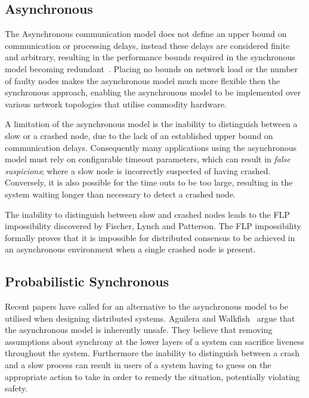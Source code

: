 	\subsection{Asynchronous}
	The Asynchronous communication model does not define an upper bound on communication or processing delays, instead these delays are considered finite and arbitrary, resulting in the performance bounds required in the synchronous model becoming redundant~\cite{Cristian:1996:SA:227210.227231}. Placing no bounds on network load or the number of faulty nodes makes the asynchronous model much more flexible then the synchronous approach, enabling the asynchronous model to be implemented over various network topologies that utilise commodity hardware. 

	A limitation of the asynchronous model is the inability to distinguish between a slow or a crashed node, due to the lack of an established upper bound on communication delays.  Consequently many applications using the asynchronous model must rely on configurable timeout parameters, which can result in \emph{false suspicions}; where a slow node is incorrectly suspected of having crashed.  Conversely, it is also possible for the time outs to be too large, resulting in the system waiting longer than necessary to detect a crashed node.  
	
	The inability to distinguish between slow and crashed nodes leads to the FLP impossibility discovered by Fischer, Lynch and Patterson\citep{Fischer:1985:IDC:3149.214121}.  The FLP impossibility formally proves that it is impossible for distributed consensus to be achieved in an asynchronous environment when a single crashed node is present. 
	
	\subsection{Probabilistic Synchronous}
	Recent papers have called for an alternative to the asynchronous model to be utilised when designing distributed systems. Aguilera and Walkfish~\cite{Aguilera:2009:NTA:1855568.1855571} argue that the asynchronous model is inherently unsafe. They believe that removing assumptions about synchrony at the lower layers of a system can sacrifice liveness throughout the system. Furthermore the inability to distinguish between a crash and a slow process can result in users of a system having to guess on the appropriate action to take in order to remedy the situation, potentially violating safety. 

